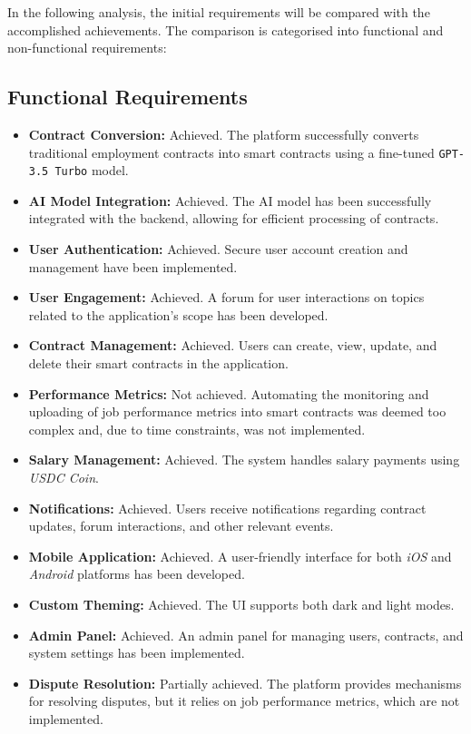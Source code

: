 In the following analysis, the initial requirements will be compared with the accomplished achievements. The comparison is categorised into functional and non-functional requirements:

\subsection{Functional Requirements}

\begin{itemize}
    \item \textbf{Contract Conversion:} Achieved. The platform successfully converts traditional employment contracts into smart contracts using a fine-tuned \texttt{GPT-3.5 Turbo} model.
    \item \textbf{AI Model Integration:} Achieved. The AI model has been successfully integrated with the backend, allowing for efficient processing of contracts.
    \item \textbf{User Authentication:} Achieved. Secure user account creation and management have been implemented.
    \item \textbf{User Engagement:} Achieved. A forum for user interactions on topics related to the application's scope has been developed.
    \item \textbf{Contract Management:} Achieved. Users can create, view, update, and delete their smart contracts in the application.
    \item \textbf{Performance Metrics:} Not achieved. Automating the monitoring and uploading of job performance metrics into smart contracts was deemed too complex and, due to time constraints, was not implemented. %
    \item \textbf{Salary Management:} Achieved. The system handles salary payments using \textit{USDC Coin}.
    \item \textbf{Notifications:} Achieved. Users receive notifications regarding contract updates, forum interactions, and other relevant events.
    \item \textbf{Mobile Application:} Achieved. A user-friendly interface for both \textit{iOS} and \textit{Android} platforms has been developed.
    \item \textbf{Custom Theming:} Achieved. The UI supports both dark and light modes.
    \item \textbf{Admin Panel:} Achieved. An admin panel for managing users, contracts, and system settings has been implemented.
    \item \textbf{Dispute Resolution:} Partially achieved. The platform provides mechanisms for resolving disputes, but it relies on job performance metrics, which are not implemented.
\end{itemize}

